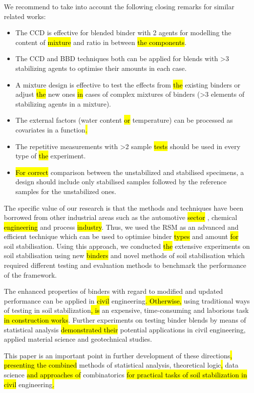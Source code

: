 \documentclass[eprint,
]{actapoly}
\begin{document}
We recommend to take into account the following closing remarks for similar related works:
\begin{itemize}
	\item The CCD is effective for blended binder with 2 agents for modelling the content of \hl{mixture }and ratio in between\hl{ the components}.
	\item The CCD and BBD techniques both can be applied for blends with >3 stabilizing agents to optimise their amounts in each case.
	\item A mixture design is effective to test the effects from \hl{the }existing binders or adjust \hl{the }new ones \hl{in }cases of complex mixtures of binders (>3 elements of stabilizing agents in a mixture).
	\item The external factors (water content \hl{or} temperature)\hl{ }can be processed as covariates in a function\hl{.}
	\item The repetitive measurements with >2 sample \hl{tests} should be used in every type of \hl{the }experiment.
	\item \hl{For correct }comparison between the unstabilized and stabilised specimens, a design should include only stabilised samples followed by the reference samples for the unstabilized ones.
\end{itemize}

The specific value of our research is that the methods and techniques have been borrowed from other industrial areas such as the automotive\hl{ sector} , chemical\hl{ engineering }and process \hl{industry}. Thus, we used the RSM as an advanced and efficient technique which can be used to optimise binder \hl{types} and amount \hl{for }soil stabilisation. Using this approach, we\hl{ }conducted \hl{the }extensive experiments on soil stabilisation using new \hl{binders }and novel methods of soil stabilisation which required different testing and evaluation methods\hl{ }to benchmark the performance of the framework. 

The enhanced properties of binders with regard to modified and updated performance can be applied in \hl{civil }engineering\hl{. Otherwise, }using traditional ways of testing in soil stabilization\hl{, is }an expensive, time-consuming and laborious task \hl{in construction works}. Further experiments on testing binder blends by\hl{ }means of statistical analysis \hl{demonstrated their }potential applications in civil engineering, applied material science and geotechnical studies. 

This paper is an important point in further development of these directions\hl{, presenting the combined }methods of statistical\hl{ }analysis, theoretical logic\hl{, }data science\hl{ and approaches of }combinatorics\hl{ for practical tasks of soil stabilization in civil }engineering\hl{.}
\end{document}
